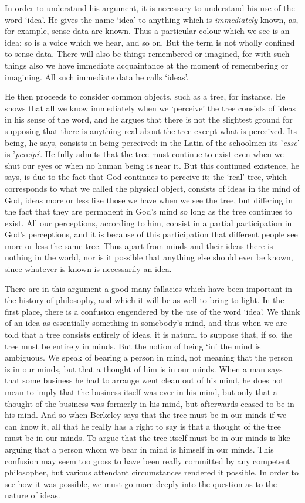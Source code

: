 \documentclass[oneside,letterpaper,12pt]{book}
\begin{document}
In order to understand his argument, it is necessary to understand his
use of the word `idea'. \label{ideas} He gives the name
`idea' to anything which is
\emph{immediately} known, as, for example, sense-data are known. Thus a
particular colour which we see is an idea; so is a voice which we hear,
and so on. But the term is not wholly confined to sense-data. There will
also be things remembered or imagined, for with such things also we have
immediate acquaintance at the moment of remembering or imagining. All
such immediate data he calls `ideas'.

He then proceeds to consider common objects, such as a tree, for
instance. He shows that all we know immediately when we
`perceive' the tree consists of ideas
in his sense of the word, and he argues that there is not the slightest
ground for supposing that there is anything real about the tree except
what is perceived. Its being, he says, consists in being perceived: in
the Latin of the schoolmen its
'\emph{esse}' is
'\emph{percipi}'. He fully admits that
the tree must continue to exist even when we shut our eyes or when no
human being is near it. But this continued existence, he says, is due to
the fact that God continues to perceive it; the
`real' tree, which corresponds to what
we called the physical object, consists of ideas in the mind of God,
ideas more or less like those we have when we see the tree, but
differing in the fact that they are permanent in God's
mind so long as the tree continues to exist. All our perceptions,
according to him, consist in a partial participation in
God's perceptions, and it is because of this
participation that different people see more or less the same tree. Thus
apart from minds and their ideas there is nothing in the world, nor is
it possible that anything else should ever be known, since whatever is
known is necessarily an idea.

There are in this argument a good many fallacies which have been
important in the history of philosophy, and which it will be as well to
bring to light. In the first place, there is a confusion engendered by
the use of the word `idea'. We think of
an idea as essentially something in somebody's mind, and
thus when we are told that a tree consists entirely of ideas, it is
natural to suppose that, if so, the tree must be entirely in minds. But
the notion of being `in' the mind is
ambiguous. We speak of bearing a person in mind, not meaning that the
person is in our minds, but that a thought of him is in our minds. When
a man says that some business he had to arrange went clean out of his
mind, he does not mean to imply that the business itself was ever in his
mind, but only that a thought of the business was formerly in his mind,
but afterwards ceased to be in his mind. And so when Berkeley says that
the tree must be in our minds if we can know it, all that he really has
a right to say is that a thought of the tree must be in our minds. To
argue that the tree itself must be in our minds is like arguing that a
person whom we bear in mind is himself in our minds. This confusion may
seem too gross to have been really committed by any competent
philosopher, but various attendant circumstances rendered it possible.
In order to see how it was possible, we must go more deeply into the
question as to the nature of ideas.
\end{document}
